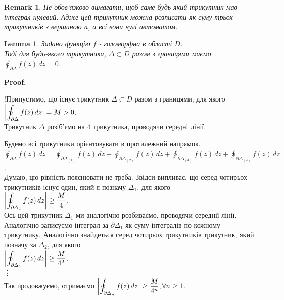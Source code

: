\documentclass[a4paper, 10pt]{article}
\makeatletter
\def\qed{$\blacksquare$}
\theoremstyle{theoremdd}
\theoremstyle{theoremdd}
\theoremstyle{theoremdd}
\theoremstyle{theoremdd}
\theoremstyle{theoremdd}
\theoremstyle{theoremdd}
\newtheorem{remark}[theorem]{Remark}
\theoremstyle{theoremdd}
\newtheorem{lemma}[theorem]{Lemma}
\theoremstyle{theoremdd}
\renewenvironment{proof}[1][Proof.\\]{\par
\pushQED{\hfill \qed}%
\normalfont \topsep6\p@\@plus6\p@\relax
\trivlist
\item\relax
{\bfseries
#1\@addpunct{.}}\hspace\labelsep\ignorespaces
}{%
\popQED\endtrivlist\@endpefalse
}
\makeatother
\begin{document}
\begin{remark}
Не обов'язково вимагати, щоб саме будь-який трикутник мав інтеграл нулевий. Адже цей трикутник можна розписати як суму трьох трикутників з вершиною $a$, а всі вони нулі автоматом.
\end{remark}

\begin{lemma}
Задано функцію $f$ - голоморфна в області $D$.\\
Тоді для будь-якого трикутника, $\Delta \subset D$ разом з границями маємо $\displaystyle\oint_{\partial \Delta} f(z)\,dz = 0$.
\end{lemma}

\begin{proof}
!Припустимо, що існує трикутник $\Delta \subset D$ разом з границями, для якого $\displaystyle\abs{ \oint_{\partial \Delta} f(z)\,dz} = M > 0$.\\
Трикутник $\Delta$ розіб'ємо на $4$ трикутника, проводячи середні лінії.
\begin{figure}[H]
\centering
{}
\end{figure}
Будемо всі трикутники орієнтовувати в протилежний напрямок.\\
$\displaystyle\oint_{\partial \Delta} f(z)\,dz = \oint_{\partial \Delta_{(1)}} f(z)\,dz + \oint_{\partial \Delta_{(2)}} f(z)\,dz + \oint_{\partial \Delta_{(3)}} f(z)\,dz + \oint_{\partial \Delta_{(4)}} f(z)\,dz$.\\
Думаю, цю рівність пояснювати не треба. Звідси випливає, що серед чотирьох трикутників існує один, який я позначу $\Delta_1$, для якого\\
$\displaystyle\abs{\oint_{\partial \Delta_1} f(z)\,dz} \geq \dfrac{M}{4}$.\\
Ось цей трикутник $\Delta_1$ ми аналогічно розбиваємо, проводячи середнії лінії. Аналогічно записуємо інтеграл за $\partial \Delta_1$ як суму інтегралів по кожному трикутнику. Аналогічно знайдеться серед чотирьох трикутників трикутник, який позначу за $\Delta_2$, для якого\\
$\displaystyle\abs{\oint_{\partial \Delta_1} f(z)\,dz} \geq \dfrac{M}{4^2}$.\\
\vdots \\
Так продовжуємо, отримаємо $\displaystyle\abs{\oint_{\partial \Delta_n} f(z)\,dz} \geq \dfrac{M}{4^n}, \forall n \geq 1$.\\

\end{proof}
\end{document}
